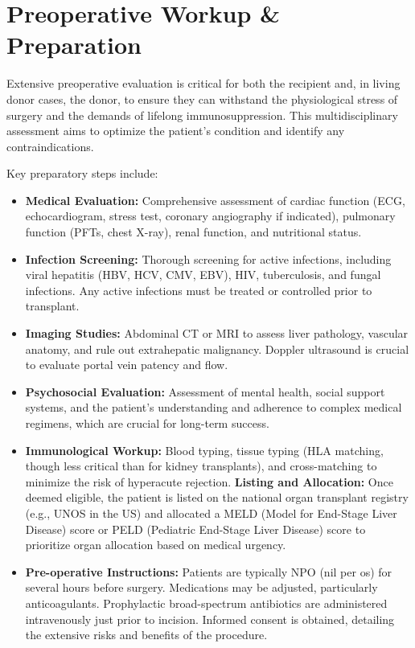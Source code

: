 \section*{Preoperative Workup \& Preparation}
Extensive preoperative evaluation is critical for both the recipient and, in living donor cases, the donor, to ensure they can withstand the physiological stress of surgery and the demands of lifelong immunosuppression. This multidisciplinary assessment aims to optimize the patient's condition and identify any contraindications.

Key preparatory steps include:
\begin{itemize}
  \item \textbf{Medical Evaluation:} Comprehensive assessment of cardiac function (ECG, echocardiogram, stress test, coronary angiography if indicated), pulmonary function (PFTs, chest X-ray), renal function, and nutritional status.
  \item \textbf{Infection Screening:} Thorough screening for active infections, including viral hepatitis (HBV, HCV, CMV, EBV), HIV, tuberculosis, and fungal infections. Any active infections must be treated or controlled prior to transplant.
  \item \textbf{Imaging Studies:} Abdominal CT or MRI to assess liver pathology, vascular anatomy, and rule out extrahepatic malignancy. Doppler ultrasound is crucial to evaluate portal vein patency and flow.
  \item \textbf{Psychosocial Evaluation:} Assessment of mental health, social support systems, and the patient's understanding and adherence to complex medical regimens, which are crucial for long-term success.
  \item \textbf{Immunological Workup:} Blood typing, tissue typing (HLA matching, though less critical than for kidney transplants), and cross-matching to minimize the risk of hyperacute rejection.
  \textbf{Listing and Allocation:} Once deemed eligible, the patient is listed on the national organ transplant registry (e.g., UNOS in the US) and allocated a MELD (Model for End-Stage Liver Disease) score or PELD (Pediatric End-Stage Liver Disease) score to prioritize organ allocation based on medical urgency.
  \item \textbf{Pre-operative Instructions:} Patients are typically NPO (nil per os) for several hours before surgery. Medications may be adjusted, particularly anticoagulants. Prophylactic broad-spectrum antibiotics are administered intravenously just prior to incision. Informed consent is obtained, detailing the extensive risks and benefits of the procedure.
\end{itemize}

